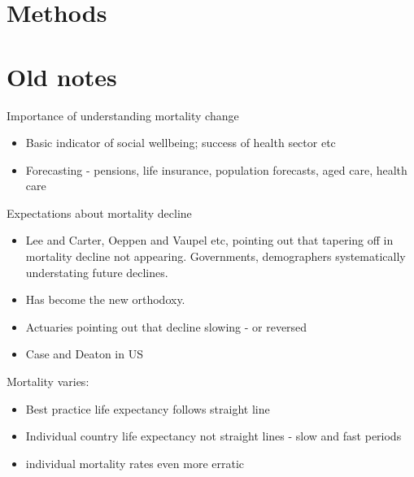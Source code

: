 \documentclass[11pt]{article}\usepackage[]{graphicx}\usepackage[]{color}
\begin{document}
 


\section*{Methods}
  \label{sec:methods}

  
 

\section{Old notes}
  
        
Importance of understanding mortality change
\begin{itemize}
  \item Basic indicator of social wellbeing; success of health sector etc
  \item Forecasting - pensions, life insurance, population forecasts, aged care, health care
\end{itemize}

Expectations about mortality decline
\begin{itemize}
    \item Lee and Carter, Oeppen and Vaupel etc, pointing out that tapering off in mortality decline not appearing. Governments, demographers systematically understating future declines. 
    \item Has become the new orthodoxy.
    \item Actuaries pointing out that decline slowing - or reversed
    \item Case and Deaton in US
 \end{itemize}


Mortality varies:
\begin{itemize}
  \item Best practice life expectancy follows straight line
  \item Individual country life expectancy not straight lines - slow and fast periods
  \item individual mortality rates even more erratic
 \end{itemize}
 
\end{document}
